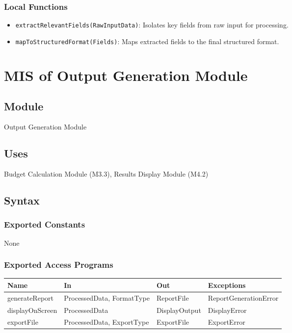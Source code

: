 \documentclass[12pt, titlepage]{article}
\begin{document}
\subsubsection{Local Functions}

\begin{itemize}
    \item \texttt{extractRelevantFields(RawInputData)}: Isolates key fields from raw input for processing.
    \item \texttt{mapToStructuredFormat(Fields)}: Maps extracted fields to the final structured format.
\end{itemize}

\newpage


\section{MIS of Output Generation Module}\label{output_generation_module}

\subsection{Module}

Output Generation Module

\subsection{Uses}

Budget Calculation Module (M3.3), Results Display Module (M4.2)

\subsection{Syntax}

\subsubsection{Exported Constants}

None

\subsubsection{Exported Access Programs}

\begin{center}
\begin{tabular}{p{4cm} p{4cm} p{4cm} p{4cm}}
\hline
\textbf{Name} & \textbf{In} & \textbf{Out} & \textbf{Exceptions} \\
\hline
generateReport & ProcessedData, FormatType & ReportFile & ReportGenerationError \\
\hline
displayOnScreen & ProcessedData & DisplayOutput & DisplayError \\
\hline
exportFile & ProcessedData, ExportType & ExportFile & ExportError \\
\hline
\end{tabular}
\end{center}
\end{document}
